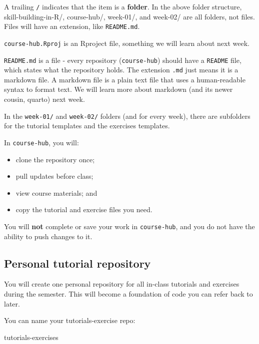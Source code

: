 \documentclass[
  letterpaper,
  DIV=11,
  numbers=noendperiod]{scrartcl}
\newenvironment{Shaded}{\begin{snugshade}}{\end{snugshade}}
\newcommand{\NormalTok}[1]{\textcolor[rgb]{0.00,0.23,0.31}{#1}}
\providecommand{\tightlist}{%
  \setlength{\itemsep}{0pt}\setlength{\parskip}{0pt}}
\begin{document}
A trailing \texttt{/} indicates that the item is a \textbf{folder}. In
the above folder structure, skill-building-in-R/, course-hub/, week-01/,
and week-02/ are all folders, not files. Files will have an extension,
like \texttt{README.md}.

\texttt{course-hub.Rproj} is an Rproject file, something we will learn
about next week.

\texttt{README.md} is a file - every repository (\texttt{course-hub})
should have a \texttt{README} file, which states what the repository
holds. The extension \texttt{.md} just means it is a markdown file. A
markdown file is a plain text file that uses a human-readable syntax to
format text. We will learn more about markdown (and its newer cousin,
quarto) next week.

In the \texttt{week-01/} and \texttt{week-02/} folders (and for every
week), there are subfolders for the tutorial templates and the exercises
templates.

In \texttt{course-hub}, you will:

\begin{itemize}
\tightlist
\item
  clone the repository once;
\item
  pull updates before class;
\item
  view course materials; and
\item
  copy the tutorial and exercise files you need.
\end{itemize}

You will \textbf{not} complete or save your work in \texttt{course-hub},
and you do not have the ability to push changes to it.

\subsection{Personal tutorial
repository}\label{personal-tutorial-repository}

You will create one personal repository for all in-class tutorials and
exercises during the semester. This will become a foundation of code you
can refer back to later.

You can name your tutorials-exercise repo:

\begin{Shaded}
\begin{Highlighting}[]
\NormalTok{tutorials{-}exercises}
\end{Highlighting}
\end{Shaded}
\end{document}
